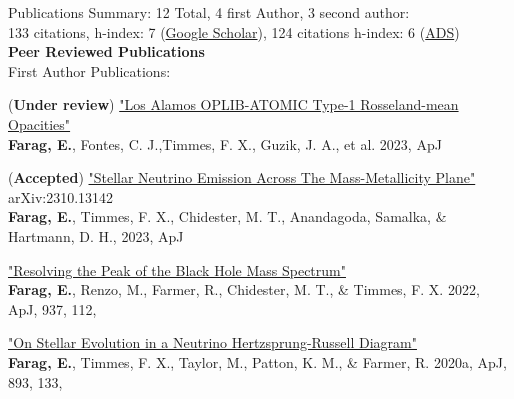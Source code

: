 \documentclass{resume} %
\begin{document}
\begin{rSection}{Publications} %
Summary: 12 Total, 4 first Author, 3 second author: \\
133 citations, h-index: 7 (\href{https://scholar.google.com/citations?user=uQxc1hMAAAAJ&hl=en}{Google Scholar}), 124 citations h-index: 6 (\href{https://ui.adsabs.harvard.edu/search/filter_author_facet_hier_fq_author=OR&filter_author_facet_hier_fq_author=author_facet_hier%3A%221%2FFarag%2C%20E%2FFarag%2C%20Ebraheem%22&filter_author_facet_hier_fq_author=author_facet_hier%3A%221%2FFarag%2C%20E%2FFarag%2C%20E%22&fq=%7B!type%3Daqp%20v%3D%24fq_author%7D&fq_author=(author_facet_hier%3A%221%2FFarag%2C%20E%2FFarag%2C%20Ebraheem%22%20OR%20author_facet_hier%3A%221%2FFarag%2C%20E%2FFarag%2C%20E%22)&q=ebraheem%20farag&sort=date%20desc%2C%20bibcode%20desc&p_=0}{ADS}) \\
\textbf{Peer Reviewed Publications}\\ 
    First Author Publications: 
    \begin{revnumerate}
    \item (\textbf{Under review}) \href{}{"Los Alamos OPLIB-ATOMIC Type-1 Rosseland-mean Opacities"}
    \\  \textbf{Farag, E.}, Fontes, C. J.,Timmes, F. X., Guzik, J. A., et al. 2023, ApJ 

    \item (\textbf{Accepted}) \href{https://arxiv.org/abs/2310.13142}{"Stellar Neutrino Emission Across The Mass-Metallicity Plane"} arXiv:2310.13142
    \\  \textbf{Farag, E.}, Timmes, F. X., Chidester, M. T., Anandagoda, Samalka, \& Hartmann, D. H., 2023, ApJ
    \item \href{https://doi.org/10.3847/1538-4357/ac8b83}{"Resolving the Peak of the Black Hole Mass Spectrum"}
    \\ \textbf{Farag, E.}, Renzo, M., Farmer, R., Chidester, M. T., \& Timmes, F. X. 2022, ApJ, 937, 112, 
    \item \href{https://doi.org/10.3847/1538-4357/ab7f2c}{"On Stellar Evolution in a Neutrino Hertzsprung-Russell Diagram"}
    \\ \textbf{Farag, E.}, Timmes, F. X., Taylor, M., Patton, K. M., \& Farmer, R. 2020a, ApJ, 893, 133,
    \end{revnumerate}


\end{rSection}
\end{document}
